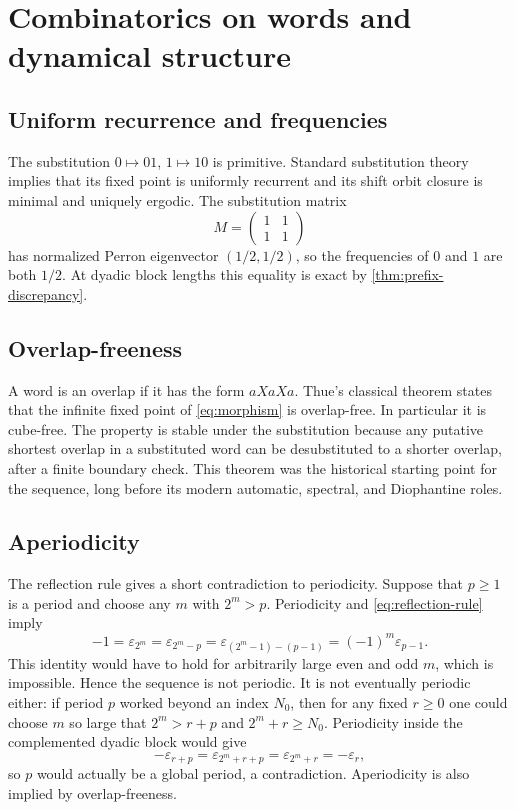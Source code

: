 \documentclass[11pt,oneside]{article}
\theoremstyle{definition}
\theoremstyle{remark}
\newcommand{\eps}{\varepsilon}
\begin{document}
\section{Combinatorics on words and dynamical structure}

\subsection{Uniform recurrence and frequencies}

The substitution $0\mapsto01$, $1\mapsto10$ is primitive.  Standard
substitution theory implies that its fixed point is uniformly recurrent and
its shift orbit closure is minimal and uniquely ergodic.  The substitution
matrix
\begin{equation}\label{eq:substitution-matrix}
 M=\begin{pmatrix}1&1\\1&1\end{pmatrix}
\end{equation}
has normalized Perron eigenvector $(1/2,1/2)$, so the frequencies of $0$ and
$1$ are both $1/2$.  At dyadic block lengths this equality is exact by
\cref{thm:prefix-discrepancy}.

\subsection{Overlap-freeness}

A word is an overlap if it has the form $aXaXa$.  Thue's classical theorem
states that the infinite fixed point of \cref{eq:morphism} is overlap-free.
In particular it is cube-free.  The property is stable under the substitution
because any putative shortest overlap in a substituted word can be desubstituted
to a shorter overlap, after a finite boundary check.  This theorem was the
historical starting point for the sequence, long before its modern automatic,
spectral, and Diophantine roles.

\subsection{Aperiodicity}\label{subsec:aperiodicity}

The reflection rule gives a short contradiction to periodicity.  Suppose that
$p\ge1$ is a period and choose any $m$ with $2^m>p$.  Periodicity and
\cref{eq:reflection-rule} imply
\[
 -1=\eps_{2^m}=\eps_{2^m-p}
    =\eps_{(2^m-1)-(p-1)}=(-1)^m\eps_{p-1}.
\]
This identity would have to hold for arbitrarily large even and odd $m$, which
is impossible.  Hence the sequence is not periodic.  It is not eventually
periodic either: if period $p$ worked beyond an index $N_0$, then for any fixed
$r\ge0$ one could choose $m$ so large that $2^m>r+p$ and $2^m+r\ge N_0$.
Periodicity inside the complemented dyadic block would give
\[
 -\eps_{r+p}=\eps_{2^m+r+p}=\eps_{2^m+r}=-\eps_r,
\]
so $p$ would actually be a global period, a contradiction.  Aperiodicity is
also implied by overlap-freeness.
\end{document}
